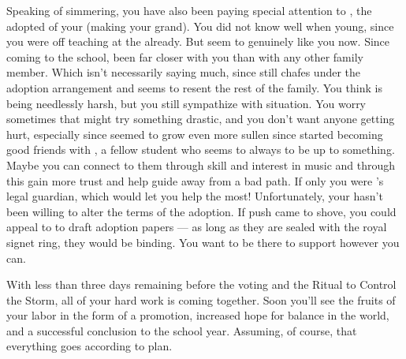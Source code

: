 \documentclass[char]{GL2020}
\begin{document}
Speaking of simmering, you have also been paying special attention to \cAdopted{\full}, the adopted \cAdopted{\offspring} of your \cAdoptedParentOne{\nibling} (making \cAdopted{} your grand\cAdopted{\nibling}). You did not know \cAdopted{} well when \cAdopted{\they \were} young, since you were off teaching at the \pSc{} already. But \cAdopted{\they} seem\cAdopted{\verbs} to genuinely like you now. Since coming to the school, \cAdopted{\theyhave} been far closer with you than with any other family member. Which isn't necessarily saying much, since \cAdopted{} still chafes under the adoption arrangement and seems to resent the rest of the family. You think \cAdopted{} is being needlessly harsh, but you still sympathize with \cAdopted{\their} situation. You worry sometimes that \cAdopted{} might try something drastic, and you don't want anyone getting hurt, especially since \cAdopted{\they \have} seemed to grow even more sullen since \cAdopted{\they} started becoming good friends with \cLibAssist{\full}, a fellow \pFarm{} student who seems to always to be up to something. Maybe you can connect to them through \cAdopted{\their} skill and interest in music and through this gain more trust and help guide \cAdopted{\them} away from a bad path. If only you were \cAdopted{}’s legal guardian, which would let you help the most! Unfortunately, your \cAdoptedParentOne{\nibling} hasn't been willing to alter the terms of the adoption. If push came to shove, you could appeal to \cPrince{\full} to draft adoption papers — as long as they are sealed with the royal signet ring, they would be binding. You want to be there to support \cAdopted{} however you can. 

With less than three days remaining before the voting and the Ritual to Control the Storm, all of your hard work is coming together. Soon you'll see the fruits of your labor in the form of a promotion, increased hope for balance in the world, and a successful conclusion to the school year. Assuming, of course, that everything goes according to plan.
\end{document}
